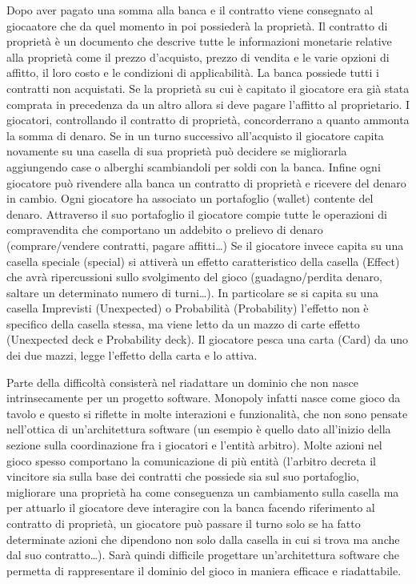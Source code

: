 Dopo aver pagato una somma alla banca e il contratto viene consegnato al giocaatore che da quel momento in poi possiederà la proprietà.
Il contratto di proprietà è un documento che descrive tutte le informazioni monetarie relative alla proprietà come il prezzo d'acquisto,
prezzo di vendita e le varie opzioni di affitto, il loro costo e le condizioni di applicabilità.
La banca possiede tutti i contratti non acquistati.\newline
Se la proprietà su cui è capitato il giocatore era già stata comprata in precedenza da un altro allora si 
deve pagare l'affitto al proprietario. I giocatori, controllando il contratto di proprietà, concorderrano a quanto ammonta la somma di denaro.
Se in un turno successivo all'acquisto il giocatore capita novamente su una casella di sua proprietà può decidere se migliorarla aggiungendo case 
o alberghi scambiandoli per soldi con la banca.
Infine ogni giocatore può rivendere alla banca un contratto di proprietà e ricevere del denaro in cambio.
Ogni giocatore ha associato un portafoglio (wallet) contente del denaro. Attraverso il suo portafoglio
il giocatore compie tutte le operazioni di compravendita che comportano un addebito o prelievo di denaro (comprare/vendere contratti, pagare affitti\dots)\newline
Se il giocatore invece capita su una casella speciale (special) si attiverà un effetto caratteristico della casella (Effect)
che avrà ripercussioni sullo svolgimento del gioco 
(guadagno/perdita denaro, saltare un determinato numero di turni\dots). 
In particolare se si capita su una casella Imprevisti (Unexpected) o Probabilità (Probability) l'effetto non 
è specifico della casella stessa, ma viene letto da un mazzo di carte effetto (Unexpected deck e Probability deck). 
Il giocatore pesca una carta (Card) da uno dei due mazzi, legge l'effetto della carta e lo attiva. \newline

Parte della difficoltà consisterà nel riadattare un dominio che non nasce intrinsecamente per un progetto software.
Monopoly infatti nasce come gioco da tavolo e questo si riflette in molte interazioni e funzionalità, che non sono pensate 
nell'ottica di un'architettura software (un esempio è quello dato all'inizio della sezione sulla coordinazione fra i giocatori e 
l'entità arbitro). Molte azioni nel gioco spesso comportano la comunicazione di più entità (l'arbitro decreta il vincitore sia sulla base dei 
contratti che possiede sia sul suo portafoglio, migliorare una
proprietà ha come conseguenza un cambiamento sulla casella ma per attuarlo il giocatore deve interagire con la banca facendo riferimento
al contratto di proprietà, un giocatore può passare il turno solo se ha fatto determinate azioni che dipendono non solo dalla casella in cui
si trova ma anche dal suo contratto\dots). 
Sarà quindi difficile progettare un'architettura software che permetta di rappresentare il dominio del gioco
in maniera efficace e riadattabile. 


